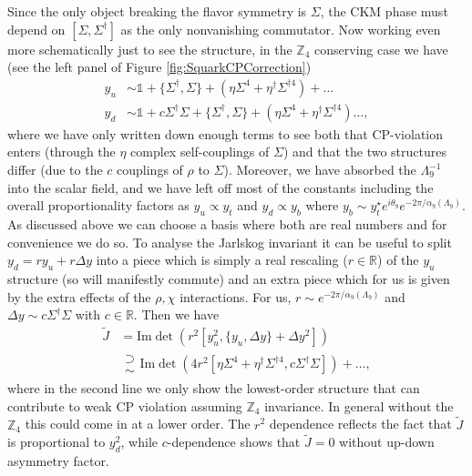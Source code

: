 \documentclass[11pt,a4paper]{article}
\newcommand\supsetsim{\mathrel{\substack{
  \textstyle\supset\\[-0.2ex]\textstyle\sim}}}
\begin{document}
Since the only object breaking the flavor symmetry is $\Sigma$, the CKM phase must depend on $\left[ \Sigma, \Sigma^\dagger \right]$ as the only nonvanishing commutator. Now working even more schematically just to see the structure, in the $\mathbb{Z}_4$ conserving case we have (see the left panel of Figure \ref{fig:SquarkCPCorrection})
\begin{align}
    y_u &\sim \mathds{1} + \lbrace \Sigma^\dagger, \Sigma \rbrace + \left(\eta \Sigma^4 + \eta^\dagger \Sigma^{\dagger 4}\right) + \dots \\
    y_d &\sim \mathds{1} + c \Sigma^\dagger \Sigma + \lbrace \Sigma^\dagger, \Sigma \rbrace + \left(\eta \Sigma^4 + \eta^\dagger \Sigma^{\dagger 4}\right) \dots,
\end{align}
where we have only written down enough terms to see both that CP-violation enters (through the $\eta$ complex self-couplings of $\Sigma$) and that the two structures differ (due to the $c$ couplings of $\rho$ to $\Sigma$). Moreover, we have absorbed the $\Lambda_9^{-1}$ into the scalar field, and we have left off most of the constants including the overall proportionality factors as $y_u \propto y_t$ and $y_d \propto y_b$ where $y_b \sim y_t^\star e^{i\theta_9} e^{- 2\pi / \alpha_9 (\Lambda_9)}$. As discussed above we can choose a basis where both are real numbers and for convenience we do so. To analyse the Jarlskog invariant it can be useful to split $y_d = r y_u + r \Delta y$ into a piece which is simply a real rescaling ($r \in \mathbb{R}$) of the $y_u$ structure (so will manifestly commute) and an extra piece which for us is given by the extra effects of the $\rho, \chi$ interactions. For us, $r \sim e^{- 2\pi / \alpha_9 (\Lambda_9)}$ and $\Delta y \sim c \Sigma^\dagger \Sigma$ with $c \in \mathbb{R}$. Then we have
\begin{align}
    \tilde{J} &= \text{Im} \det \left( r^2 \left[ y_u^2,  \lbrace y_u, \Delta y\rbrace + \Delta y^2 \right]\right) \\
    &\supsetsim \text{Im} \det \left( 4 r^2 \left[ \eta \Sigma^4 + \eta^\dagger \Sigma^{\dagger 4}, c \Sigma^\dagger \Sigma \right] \right) + \dots,
\end{align}
%
where in the second line we only show the lowest-order structure that can contribute to weak CP violation assuming $\mathbb{Z}_4$ invariance. In general without the $\mathbb{Z}_4$ this could come in at a lower order. The $r^2$ dependence reflects the fact that $\tilde{J}$ is proportional to $y_d^2$, while $c$-dependence shows that $\tilde{J}=0$ without up-down asymmetry factor. 
\end{document}

